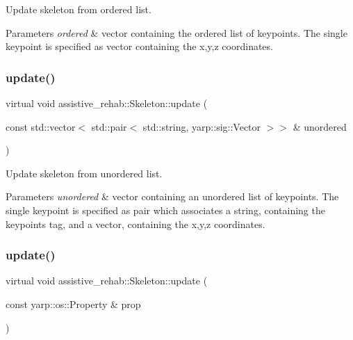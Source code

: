 Update skeleton from ordered list. 


\begin{DoxyParams}{Parameters}
{\em ordered} & vector containing the ordered list of keypoints. The single keypoint is specified as vector containing the x,y,z coordinates. \\
\hline
\end{DoxyParams}
\mbox{\label{classassistive__rehab_1_1Skeleton_ab9642d6621d0a2b189c020f4d7695b14}} 
\subsubsection{\texorpdfstring{update()}{update()}\hspace{0.1cm}{\footnotesize\ttfamily [2/3]}}
{\footnotesize\ttfamily virtual void assistive\+\_\+rehab\+::\+Skeleton\+::update (\begin{DoxyParamCaption}\item[{const std\+::vector$<$ std\+::pair$<$ std\+::string, yarp\+::sig\+::\+Vector $>$$>$ \&}]{unordered }\end{DoxyParamCaption})\hspace{0.3cm}{\ttfamily [virtual]}}



Update skeleton from unordered list. 


\begin{DoxyParams}{Parameters}
{\em unordered} & vector containing an unordered list of keypoints. The single keypoint is specified as pair which associates a string, containing the keypoint\textquotesingle{}s tag, and a vector, containing the x,y,z coordinates. \\
\hline
\end{DoxyParams}
\mbox{\label{classassistive__rehab_1_1Skeleton_ae3346b2f363e1812fdc88e59d1f7bf7d}} 
\subsubsection{\texorpdfstring{update()}{update()}\hspace{0.1cm}{\footnotesize\ttfamily [3/3]}}
{\footnotesize\ttfamily virtual void assistive\+\_\+rehab\+::\+Skeleton\+::update (\begin{DoxyParamCaption}\item[{const yarp\+::os\+::\+Property \&}]{prop }\end{DoxyParamCaption})\hspace{0.3cm}{\ttfamily [virtual]}}



